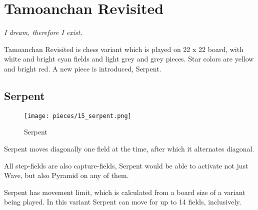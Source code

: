

\chapter*{Tamoanchan Revisited}
\label{ch:Tamoanchan Revisited}

\begin{flushright}
\parbox{0.6\textwidth}{
\emph{I dream, therefore I exist. \newline
{} } }
\end{flushright}

\noindent
Tamoanchan Revisited is chess variant which is played on 22 x 22 board,
with white and bright cyan fields and light grey and grey pieces.
Star colors are yellow and bright red.
A new piece is introduced, Serpent.

\clearpage %

\section*{Serpent}
\label{sec:Tamoanchan Revisited/Serpent}

\vspace*{-0.7\baselineskip}
\noindent
\begin{wrapfigure}[11]{l}{0.4\textwidth}
\centering
\texttt{[image: pieces/15\_serpent.png]}
\caption{Serpent}
\label{fig:15_serpent}
\end{wrapfigure}
Serpent moves diagonally one field at the time, after which it alternates
diagonal.

All step-fields are also capture-fields, Serpent would be able to activate
not just Wave, but also Pyramid on any of them.

Serpent has movement limit, which is calculated from a board size of a variant
being played. In this variant Serpent can move for up to 14 fields, inclusively.

